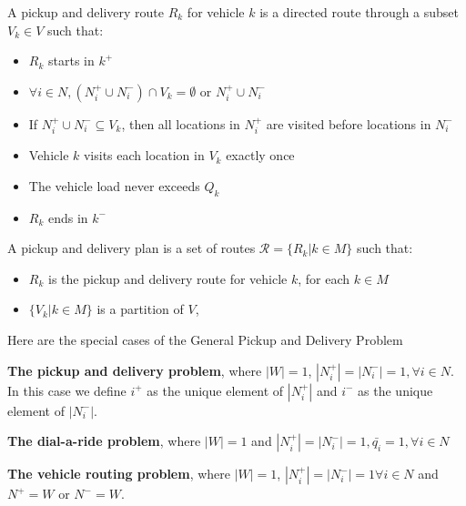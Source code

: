 				\begin{definition}
					A pickup and delivery route $R_k$ for vehicle $k$ is a directed route through a subset $V_k \in V$ such that:
					\begin{itemize}
						\item $R_k$ starts in $k^+$
						\item $\forall i \in N, (N_i^+ \cup N_i^-) \cap V_k = \emptyset \text{ or } N_i^+ \cup N_i^-$
						\item If $N_i^+ \cup N_i^- \subseteq V_k$, then all locations in $N_i^+$ are visited before locations in $N_i^-$
						\item Vehicle $k$ visits each location in $V_k$ exactly once
						\item The vehicle load never exceeds $Q_k$
						\item $R_k$ ends in $k^-$
					\end{itemize}
				\end{definition}

				\begin{definition}
					A pickup and delivery plan is a set of routes $\mathcal{R} = \{R_k |k \in M\}$ such that:
					\begin{itemize}
						\item $R_k$ is the pickup and delivery route for vehicle $k$, for each $k \in M$
						\item $\{V_k |k \in M\}$ is a partition of $V$,
					\end{itemize}
				\end{definition}

				Here are the special cases of the General Pickup and Delivery Problem
				\begin{example}
					\textbf{The pickup and delivery problem}, where $|W| = 1$, $|N_i^+| = |N_i^-| = 1, \forall i \in N$. In this case we define $i^+$ as the unique element of $|N_i^+|$ and $i^-$ as the unique element of $|N_i^-|$.
				\end{example}

				\begin{example}
					\textbf{The dial-a-ride problem}, where $|W| = 1$ and $|N_i^+| = |N_i^-| = 1, \bar{q_i} = 1, \forall i \in N$
				\end{example}

				\begin{example}
					\textbf{The vehicle routing problem}, where $|W| = 1$, $|N_i^+| = |N_i^-| = 1 \forall i \in N$ and $N^+ = W$ or $N^- = W$.
				\end{example}

